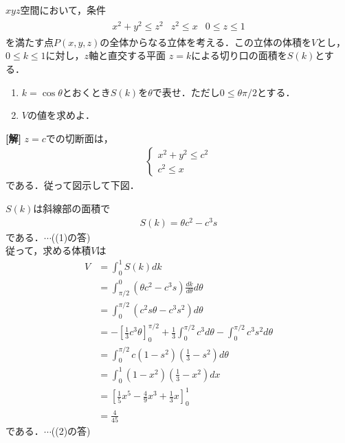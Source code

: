 \documentclass[a4j]{jarticle}
\begin{document}

     \begin{oframed}
     $xyz$空間において，条件
          \begin{align*}
               \begin{array}{lll}
               x^2+y^2\le z^2&z^2\le x&0\le z\le1
               \end{array}
          \end{align*}
     を満たす点$P(x,y,z)$の全体からなる立体を考える．この立体の体積を$V$とし，$0\le k\le 1$に対し，$z$軸と直交する平面
     $z=k$による切り口の面積を$S(k)$とする．
          \begin{enumerate}[(1)]
          \item $k=\cos\theta$とおくとき$S(k)$を$\theta$で表せ．ただし$0\le\theta\pi/2$とする．
          \item $V$の値を求めよ．
          \end{enumerate}
     \end{oframed}

\setlength{\columnseprule}{0.4pt}
\begin{multicols}{2}
{\bf[解]} \1 $z=c$での切断面は，
     \begin{align*}
          \begin{cases}
          x^2+y^2\le c^2 \\
          c^2\le x
          \end{cases}
     \end{align*}
である．従って図示して下図．
     \begin{center}
     \scalebox{.7}{}
     \end{center}

$S(k)$は斜線部の面積で
     \begin{align*}
     S(k)=\theta c^2-c^3s
     \end{align*}
である．$\cdots$((1)の答) \\
従って，求める体積$V$は
     \begin{align*}
     V&=\int_0^1S(k)dk \\ 
     &=\int_{\pi/2}^0(\theta c^2-c^3s)\frac{dk}{d\theta}d\theta\\
     &=\int_0^{\pi/2}(c^2s\theta-c^3s^2)d\theta\\
     &=-\left[\frac{1}{3}c^3\theta \right]_0^{\pi/2}+\frac{1}{3}\int_0^{\pi/2}c^3d\theta-\int_0^{\pi/2}c^3s^2d\theta \\
     &=\int_0^{\pi/2}c(1-s^2)\left(\frac{1}{3}-s^2\right)d\theta \\
     &=\int_0^1(1-x^2)\left(\frac{1}{3}-x^2\right)dx \\
     &=\left[\frac{1}{5}x^5-\frac{4}{9}x^3+\frac{1}{3}x\right]_0^1 \\
     &=\frac{4}{45}
     \end{align*}
である．$\cdots$((2)の答)
  
\newpage
\end{multicols}
\end{document}
